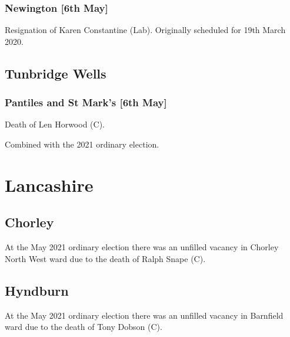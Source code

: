 \documentclass[a4paper,openany]{book}
\begin{document}
\begin{resultsiii}
\subsubsection*{Newington \hspace*{\fill}\nolinebreak[1]%
	\enspace\hspace*{\fill}
	[6th May]}


Resignation of Karen Constantine (Lab).  Originally scheduled for 19th March 2020.

\subsection*{Tunbridge Wells}

\subsubsection*{Pantiles and St Mark's \hspace*{\fill}\nolinebreak[1]%
	\enspace\hspace*{\fill}
	[6th May]}


Death of Len Horwood (C).

Combined with the 2021 ordinary election.

\section{Lancashire}

\subsection*{Chorley}

At the May 2021 ordinary election there was an unfilled vacancy in Chorley North West ward due to the death of Ralph Snape (C).

\subsection*{Hyndburn}

At the May 2021 ordinary election there was an unfilled vacancy in Barnfield ward due to the death of Tony Dobson (C).


\end{resultsiii}
\end{document}
